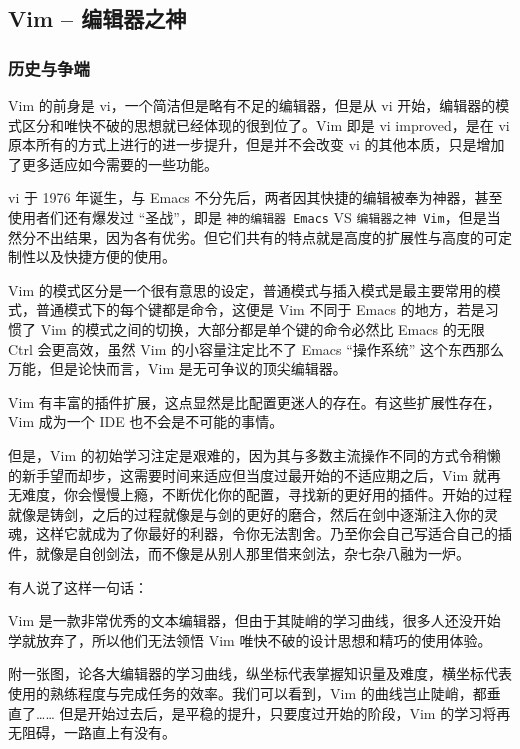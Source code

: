 
\subsection{Vim -- 编辑器之神}

\subsubsection{历史与争端}

Vim 的前身是 vi，一个简洁但是略有不足的编辑器，但是从 vi 开始，编辑器的模式区分和唯快不破的思想就已经体现的很到位了。Vim 即是 vi improved，是在 vi 原本所有的方式上进行的进一步提升，但是并不会改变 vi 的其他本质，只是增加了更多适应如今需要的一些功能。

vi 于 1976 年诞生，与 Emacs 不分先后，两者因其快捷的编辑被奉为神器，甚至使用者们还有爆发过 “圣战”，即是 \texttt{神的编辑器 Emacs} VS \texttt{编辑器之神 Vim}，但是当然分不出结果，因为各有优劣。但它们共有的特点就是高度的扩展性与高度的可定制性以及快捷方便的使用。

Vim 的模式区分是一个很有意思的设定，普通模式与插入模式是最主要常用的模式，普通模式下的每个键都是命令，这便是 Vim 不同于 Emacs 的地方，若是习惯了 Vim 的模式之间的切换，大部分都是单个键的命令必然比 Emacs 的无限 Ctrl 会更高效，虽然 Vim 的小容量注定比不了 Emacs “操作系统” 这个东西那么万能，但是论快而言，Vim 是无可争议的顶尖编辑器。

Vim 有丰富的插件扩展，这点显然是比配置更迷人的存在。有这些扩展性存在，Vim 成为一个 IDE 也不会是不可能的事情。

但是，Vim 的初始学习注定是艰难的，因为其与多数主流操作不同的方式令稍懒的新手望而却步，这需要时间来适应但当度过最开始的不适应期之后，Vim 就再无难度，你会慢慢上瘾，不断优化你的配置，寻找新的更好用的插件。开始的过程就像是铸剑，之后的过程就像是与剑的更好的磨合，然后在剑中逐渐注入你的灵魂，这样它就成为了你最好的利器，令你无法割舍。乃至你会自己写适合自己的插件，就像是自创剑法，而不像是从别人那里借来剑法，杂七杂八融为一炉。

有人说了这样一句话：

Vim 是一款非常优秀的文本编辑器，但由于其陡峭的学习曲线，很多人还没开始学就放弃了，所以他们无法领悟 Vim 唯快不破的设计思想和精巧的使用体验。

附一张图，论各大编辑器的学习曲线，纵坐标代表掌握知识量及难度，横坐标代表使用的熟练程度与完成任务的效率。我们可以看到，Vim 的曲线岂止陡峭，都垂直了…… 但是开始过去后，是平稳的提升，只要度过开始的阶段，Vim 的学习将再无阻碍，一路直上有没有。

